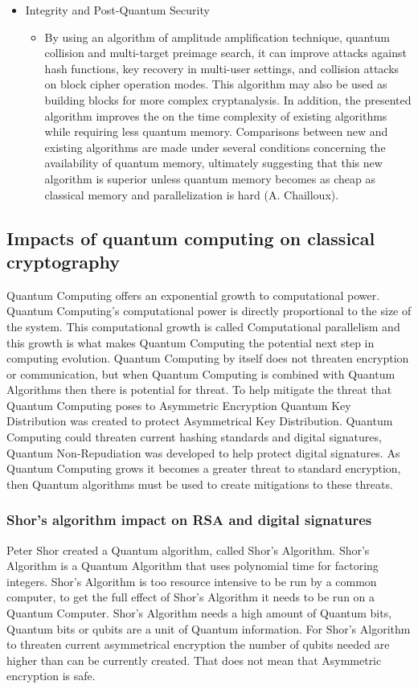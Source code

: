 \documentclass[sigconf]{acmart}
\begin{document}
\begin{itemize}
\item Integrity and Post-Quantum Security %
	\begin{itemize}
	\item By using an algorithm of amplitude amplification technique, quantum collision and multi-target preimage search, it can improve attacks against hash functions, key recovery in multi-user settings, and collision attacks on block cipher operation modes. This algorithm may also be used as building blocks for more complex cryptanalysis.  In addition, the presented algorithm improves the on the time complexity of existing algorithms while requiring less quantum memory. Comparisons between new and existing algorithms are made under several conditions concerning the availability of quantum memory, ultimately suggesting that this new algorithm is superior unless quantum memory becomes as cheap as classical memory and parallelization is hard (A. Chailloux).
	\end{itemize}
\end{itemize}



\subsection{Impacts of quantum computing on classical cryptography}
Quantum Computing offers an exponential growth to computational power. Quantum Computing’s computational power is directly proportional to the size of the system. This computational growth is called Computational parallelism and this growth is what makes Quantum Computing the potential next step in computing evolution. Quantum Computing by itself does not threaten encryption or communication, but when Quantum Computing is combined with Quantum Algorithms then there is potential for threat. To help mitigate the threat that Quantum Computing poses to Asymmetric Encryption Quantum Key Distribution was created to protect Asymmetrical Key Distribution. Quantum Computing could threaten current hashing standards and digital signatures, Quantum Non-Repudiation was developed to help protect digital signatures. As Quantum Computing grows it becomes a greater threat to standard encryption, then Quantum algorithms must be used to create mitigations to these threats.   

\subsubsection{Shor's algorithm impact on RSA and digital signatures}
Peter Shor created a Quantum algorithm, called Shor’s Algorithm. Shor’s Algorithm is a Quantum Algorithm that uses polynomial time for factoring integers. Shor’s Algorithm is too resource intensive to be run by a common computer, to get the full effect of Shor’s Algorithm it needs to be run on a Quantum Computer. Shor’s Algorithm needs a high amount of Quantum bits, Quantum bits or qubits are a unit of Quantum information. For Shor’s Algorithm to threaten current asymmetrical encryption the number of qubits needed are higher than can be currently created. That does not mean that Asymmetric encryption is safe.
 
\end{document}
